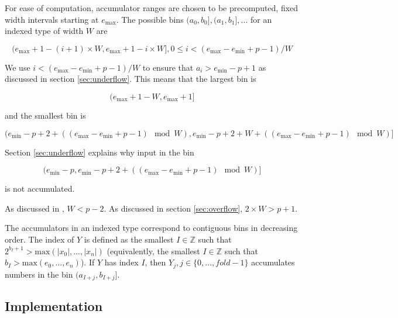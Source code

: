 \documentclass[12pt]{article}
\providecommand{\Z}{\ensuremath{\mathbb{Z}}}
\providecommand{\min}{\ensuremath{\text{min}}}
\providecommand{\max}{\ensuremath{\text{max}}}
\theoremstyle{plain}
\begin{document}
    For ease of computation, accumulator ranges are chosen to be precomputed, fixed width intervals starting at $e_{\max}$. The possible bins $(a_0, b_0], (a_1, b_1], ...$ for an indexed type of width $W$ are

    \begin{equation*}
    (e_{\max} + 1 - (i + 1)\times W, e_{\max} + 1 - i \times W], 0 \leq i < (e_{\max} - e_{\min} + p - 1)/W
    \end{equation*}

    We use $i < (e_{\max} - e_{\min} + p - 1)/W$ to ensure that $a_i > e_{\min} - p + 1$ as discussed in section \ref{sec:underflow}. This means that the largest bin is

    \begin{equation*}
    (e_{\max} + 1 - W, e_{\max} + 1]
    \end{equation*}

    and the smallest bin is

    \begin{equation*}
    (e_{\min} - p + 2 + ((e_{\max} - e_{\min} + p - 1)\mod W),
    e_{\min} - p + 2 + W + ((e_{\max} - e_{\min} + p - 1)\mod W)]
    \end{equation*}

    Section \ref{sec:underflow} explains why input in the bin

    \begin{equation*}
    (e_{\min} - p, e_{\min} - p + 2 + ((e_{\max} - e_{\min} + p - 1) \mod W)]
    \end{equation*}

    is not accumulated.

    As discussed in \cite{repsum}, $W < p - 2$. As discussed in section \ref{sec:overflow}, $2\times W > p + 1$.

    The accumulators in an indexed type correspond to contiguous bins in decreasing order. The index of $Y$ is defined as the smallest $I \in \Z$ such that $2^{b_I + 1} > \max(|x_0|, ..., |x_n|)$ (equivalently, the smallest $I \in \Z$ such that $b_I > \max(e_0, ..., e_n)$). If $Y$ has index $I$, then $Y_j, j \in \{0, ..., fold - 1\}$ accumulates numbers in the bin $(a_{I + j}, b_{I + j}]$.

  \subsection{Implementation}
\end{document}
